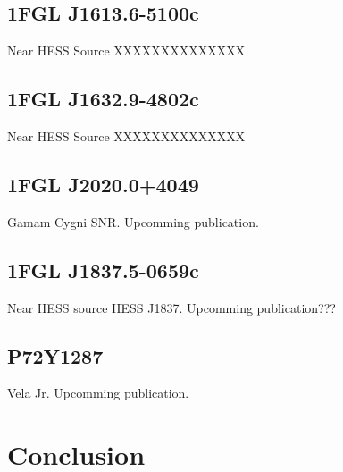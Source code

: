 \documentclass[preprint]{aastex}
\begin{document}
\subsection{1FGL J1613.6-5100c}
Near HESS Source XXXXXXXXXXXXXX

\subsection{1FGL J1632.9-4802c}
Near HESS Source XXXXXXXXXXXXXX

\subsection{1FGL J2020.0+4049}
Gamam Cygni SNR. Upcomming publication.

\subsection{1FGL J1837.5-0659c}
Near HESS source HESS J1837. Upcomming publication???

\subsection{P72Y1287}

Vela Jr. Upcomming publication.

\section{Conclusion}

\appendix
\end{document}
